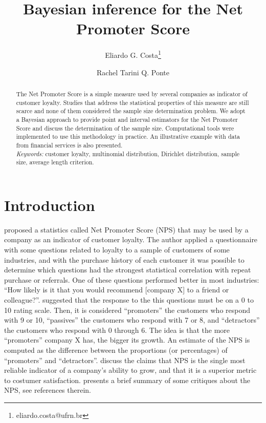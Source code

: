 \documentclass[12pt,a4paper]{article}%
\title{Bayesian inference for the Net Promoter Score}
\author[1]{Eliardo G. Costa\thanks{eliardo.costa@ufrn.br}}
\author[2]{Rachel Tarini Q. Ponte}%
\affil[1]{Departamento de Estatística, Universidade Federal do Rio 
Grande do Norte, Natal/RN, Brazil}
\affil[2]{Ânima Educação, Natal/RN, Brazil}
\begin{document}
\maketitle
\onehalfspacing%

\begin{abstract}
The Net Promoter Score is a simple measure used by several companies as indicator of customer loyalty. Studies that address the statistical properties of this measure are still scarce and none of them considered the sample size determination problem. We adopt a Bayesian approach to provide point and interval estimators for the Net Promoter Score and discuss the determination of the sample size. Computational tools were implemented to use this methodology in practice. An illustrative example with data from financial services is also presented.
\\

\noindent
{\it Keywords:} customer loyalty, multinomial distribution, Dirichlet distribution, sample size, average length criterion.
\end{abstract}

\section{Introduction}

\cite{Reichheld2003} proposed a statistics called Net Promoter Score (NPS) that may be used by a company as an indicator of customer loyalty. The author applied a questionnaire with some questions related to loyalty to a sample of customers of some industries, and with the purchase history of each customer it was possible to determine which questions had the strongest statistical correlation with repeat purchase or referrals. One of these questions performed better in most industries: ``How likely is it that you would recommend [company X] to a friend or colleague?''. \cite{Reichheld2003} suggested that the response to the this questions must be on a 0 to 10 rating scale. Then, it is considered ``promoters'' the customers who respond with 9 or 10, ``passives'' the customers who respond with 7 or 8, and ``detractors'' the customers who respond with 0 through 6. The idea is that the more ``promoters'' company X has, the bigger its growth. An estimate of the NPS is computed as the difference between the proportions (or percentages) of ``promoters'' and ``detractors''. \cite{Keininghametal2008} discuss the claims that NPS is the single most reliable indicator of a company's ability to grow, and that it is a superior metric to costumer satisfaction. \cite{Rocks2016} presents a brief summary of some critiques about the NPS, see references therein.
\end{document}
